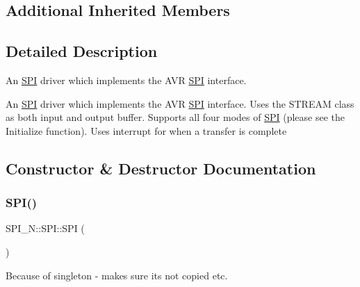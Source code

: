 \subsection*{Additional Inherited Members}


\subsection{Detailed Description}
An \hyperlink{class_s_p_i___n_1_1_s_p_i}{S\+PI} driver which implements the A\+VR \hyperlink{class_s_p_i___n_1_1_s_p_i}{S\+PI} interface. 

An \hyperlink{class_s_p_i___n_1_1_s_p_i}{S\+PI} driver which implements the A\+VR \hyperlink{class_s_p_i___n_1_1_s_p_i}{S\+PI} interface. Uses the S\+T\+R\+E\+AM class as both input and output buffer. Supports all four modes of \hyperlink{class_s_p_i___n_1_1_s_p_i}{S\+PI} (please see the Initialize function). Uses interrupt for when a transfer is complete 

\subsection{Constructor \& Destructor Documentation}
\hypertarget{class_s_p_i___n_1_1_s_p_i_ab486ba0f0d9ec880520e568762cc6c7d}{}\label{class_s_p_i___n_1_1_s_p_i_ab486ba0f0d9ec880520e568762cc6c7d} 
\subsubsection{\texorpdfstring{S\+P\+I()}{SPI()}\hspace{0.1cm}{\footnotesize\ttfamily [1/2]}}
{\footnotesize\ttfamily S\+P\+I\+\_\+\+N\+::\+S\+P\+I\+::\+S\+PI (\begin{DoxyParamCaption}\item[{const \hyperlink{class_s_p_i___n_1_1_s_p_i}{S\+PI} \&}]{ }\end{DoxyParamCaption})\hspace{0.3cm}{\ttfamily [delete]}}

Because of singleton -\/ makes sure its not copied etc. \hypertarget{class_s_p_i___n_1_1_s_p_i_a8fec1a6e642a5758acf974b92e28a9e6}{}\label{class_s_p_i___n_1_1_s_p_i_a8fec1a6e642a5758acf974b92e28a9e6} 
